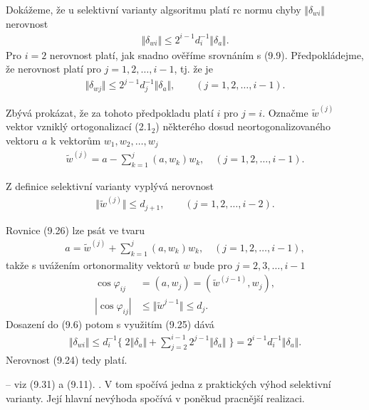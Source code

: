 Dokážeme, že u selektivní varianty algsoritmu platí rc normu
chyby $\Vert \delta_{wi} \Vert$ nerovnost
%
\begin{align*}
\tag{9.24}
\Vert \delta_{wi} \Vert \le 2^{i-1} d_i^{-1} \Vert \delta_a \Vert.
\end{align*}
%
Pro $i=2$ nerovnost platí, jak snadno ověříme srovnáním s (9.9).
Předpokládejme, že nerovnost platí pro $j=1,2,\ldots,i-1$, tj. že je
%
\begin{align*}
\tag{9.25}
\Vert \delta_{wj} \Vert \le 2^{j-1} d_j^{-1} \Vert \delta_a \Vert,
      \qquad (j=1,2,\ldots,i-1).
\end{align*}

\noindent
Zbývá prokázat, že za tohoto předpokladu platí $i$ pro $j=i$.  Označme
$\widetilde w^{(j)}$ vektor vzniklý ortogonalizací (2.1$_2$) některého
dosud neortogonalizovaného vektoru $a$ k vektorům $w_1,w_2,\dots,w_j$
%
\begin{align*}
\tag{9.26}
\widetilde w^{(j)} = a - \sum_{k=1}^j (a,w_k)w_k, \quad (j=1,2,\ldots,i-1).
\end{align*}

\noindent
Z definice selektivní varianty vyplývá nerovnost
%
\begin{align*}
\tag{9.27}
\Vert \widetilde w^{(j)} \Vert \le d_{j+1}, \quad \quad (j=1,2,\ldots,i-2).
\end{align*}

\noindent
Rovnice (9.26) lze psát ve tvaru
%
\begin{align*}
\tag{9.28}
a = \widetilde w^{(j)} + \sum_{k=1}^j (a,w_k) w_k, \quad (j=1,2,\ldots,i-1),
\end{align*}
%
takže s uvážením ortonormality vektorů $w$ bude pro $j=2,3,\ldots,i-1$
%
\begin{align*}
\tag{9.29}
\cos \varphi_{ij} &= (a,w_j) = (\widetilde w^{(j-1)},w_j),\\
\tag{9.30}
| \cos \varphi_{ij} | &\le \Vert \widetilde w^{j-1} \Vert \le d_j.
\end{align*}
%
Dosazení do (9.6) potom s využitím (9.25) dává
%
\begin{align*}
\tag{9.31}
\Vert \delta_{wi} \Vert \le d_i^{-1}
   \Big\{\; 2\Vert \delta_a \Vert +
   \sum_{j=2}^{i-1} 2^{j-1} \Vert \delta_a \Vert \; \Big\}
   = 2^{i-1} d_i^{-1} \Vert \delta_a \Vert.
\end{align*}
%
Nerovnost (9.24) tedy platí.


-- viz (9.31) a (9.11). . V tom spočívá jedna z praktických
výhod selektivní varianty. Její hlavní nevýhoda spočívá v poněkud
pracnější realizaci.


